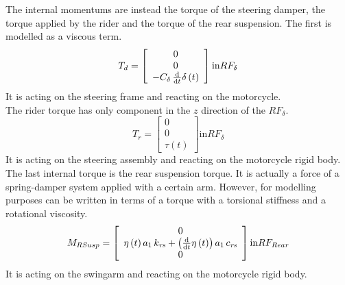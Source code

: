 %
The internal momentums are instead the torque of the steering damper, the torque applied by the rider and the torque of the rear suspension. 
The first is modelled as a viscous term.
%
\begin{equation}
    T_{d} = 
    \left[
    \begin{array}{c}
        0\\
        0\\
        -C_{\delta}\,{\frac {\rm d}{{\rm d}t}}\delta \left( t \right) 
    \end{array}
    \right ]
    \text{in} RF_{\delta}
\end{equation}
%
It is acting on the steering frame and reacting on the motorcycle.\\
The rider torque has only component in the $z$ direction of the $RF_\delta$.
%
\begin{equation}
    T_{r} = 
    \left[
    \begin{array}{c}
        0\\
        0\\
        \tau(t)
    \end{array}
    \right ]
    \text{in} RF_{\delta}
\end{equation}
%
It is acting on the steering assembly and reacting on the motorcycle rigid body.
The last internal torque is the rear suspension torque. It is actually a force of a spring-damper system applied with a certain arm. However, for modelling purposes can be written in terms of a torque with a torsional stiffness and a rotational viscosity.
%
\begin{equation}
    M_{RSusp} = 
    \left[
    \begin{array}{c}
        0\\
        \eta \left( t \right) a_{1}\,k_{{\it rs}}+ \left( {\frac {\rm d}{
            {\rm d}t}}\eta \left( t \right)  \right) a_{1}\,c_{{\it rs}} \\
        0
    \end{array}
    \right ]
    \text{in} RF_{Rear}
\end{equation}
%
It is acting on the swingarm and reacting on the motorcycle rigid body.
%